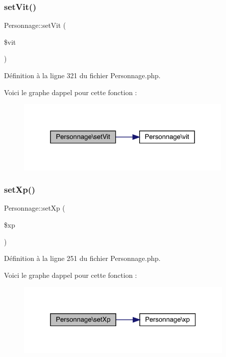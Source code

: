 \subsubsection{\texorpdfstring{set\+Vit()}{setVit()}}
{\footnotesize\ttfamily Personnage\+::set\+Vit (\begin{DoxyParamCaption}\item[{}]{\$vit }\end{DoxyParamCaption})}



Définition à la ligne 321 du fichier Personnage.\+php.

Voici le graphe d\textquotesingle{}appel pour cette fonction \+:\nopagebreak
\begin{figure}[H]
\begin{center}
\leavevmode
\includegraphics[width=296pt]{class_personnage_a9092edaae21c2eaf48315a022cd5986c_cgraph}
\end{center}
\end{figure}
\mbox{\label{class_personnage_a3f0be4dea35c2bf12f7c5cb9bf7c2f9c}} 
\subsubsection{\texorpdfstring{set\+Xp()}{setXp()}}
{\footnotesize\ttfamily Personnage\+::set\+Xp (\begin{DoxyParamCaption}\item[{}]{\$xp }\end{DoxyParamCaption})}



Définition à la ligne 251 du fichier Personnage.\+php.

Voici le graphe d\textquotesingle{}appel pour cette fonction \+:\nopagebreak
\begin{figure}[H]
\begin{center}
\leavevmode
\includegraphics[width=298pt]{class_personnage_a3f0be4dea35c2bf12f7c5cb9bf7c2f9c_cgraph}
\end{center}
\end{figure}
\mbox{\label{class_personnage_a19b9b5a7408d7d8b707e278e24af358f}} 
